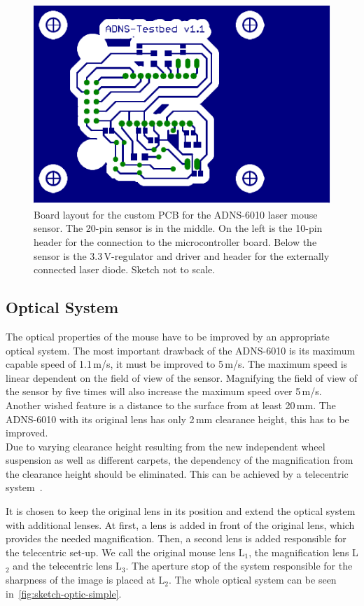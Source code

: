 \documentclass[12pt,a4paper]{article}
\begin{document}
\begin{figure}[htbp]
\begin{center}
\includegraphics[width=0.5\columnwidth]{figures/platine}
\caption{\label{fig:testplatine-board}
Board layout for the custom PCB for the ADNS-6010 laser mouse sensor.
The 20-pin sensor is in the middle.
On the left is the 10-pin header for the connection to the microcontroller board.
Below the sensor is the 3.3\,V-regulator and driver and header for the externally connected laser diode.
Sketch not to scale.
}
\end{center}
\end{figure}

\subsection{Optical System}
\label{optics}


The optical properties of the mouse have to be improved by an appropriate optical system.
The most important drawback of the ADNS-6010 is its maximum capable speed of 1.1\,m/s, it must be improved to 5\,m/s. 
The maximum speed is linear dependent on the field of view of the sensor.
Magnifying the field of view of the sensor by five times will also increase the maximum speed over 5\,m/s.\\
Another wished feature is a distance to the surface from at least 20\,mm.
The ADNS-6010 with its original lens has only 2\,mm clearance height, this has to be improved.\\
Due to varying clearance height resulting from the new independent wheel suspension as well as different carpets, the dependency of the magnification from the clearance height should be eliminated.
This can be achieved by a telecentric system~\cite{telec}.

It is chosen to keep the original lens in its position and extend the optical system with additional lenses.
At first, a lens is added in front of the original lens, which provides the needed magnification.
Then, a second lens is added responsible for the telecentric set-up.
We call the original mouse lens L$_1$, the magnification lens L$_2$ and the telecentric lens L$_3$. 
The aperture stop of the system responsible for the sharpness of the image is placed at L$_2$.
The whole optical system can be seen in~\autoref{fig:sketch-optic-simple}.
\end{document}
